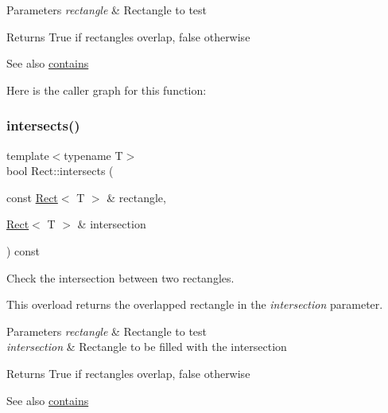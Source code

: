 \begin{DoxyParams}{Parameters}
{\em rectangle} & Rectangle to test\\
\hline
\end{DoxyParams}
\begin{DoxyReturn}{Returns}
True if rectangles overlap, false otherwise
\end{DoxyReturn}
\begin{DoxySeeAlso}{See also}
\hyperlink{classsf_1_1_rect_a1d8a4a3aecec18310f6e3e23db43dfb8}{contains} 
\end{DoxySeeAlso}
Here is the caller graph for this function\+:
\mbox{\label{classsf_1_1_rect_a555557c511ad6bfe0359a97c0ce1a003}} 
\subsubsection{\texorpdfstring{intersects()}{intersects()}\hspace{0.1cm}{\footnotesize\ttfamily [2/2]}}
{\footnotesize\ttfamily template$<$typename T$>$ \\
bool Rect\+::intersects (\begin{DoxyParamCaption}\item[{const \hyperlink{classsf_1_1_rect}{Rect}$<$ T $>$ \&}]{rectangle,  }\item[{\hyperlink{classsf_1_1_rect}{Rect}$<$ T $>$ \&}]{intersection }\end{DoxyParamCaption}) const}



Check the intersection between two rectangles. 

This overload returns the overlapped rectangle in the {\itshape intersection} parameter.


\begin{DoxyParams}{Parameters}
{\em rectangle} & Rectangle to test \\
\hline
{\em intersection} & Rectangle to be filled with the intersection\\
\hline
\end{DoxyParams}
\begin{DoxyReturn}{Returns}
True if rectangles overlap, false otherwise
\end{DoxyReturn}
\begin{DoxySeeAlso}{See also}
\hyperlink{classsf_1_1_rect_a1d8a4a3aecec18310f6e3e23db43dfb8}{contains} 
\end{DoxySeeAlso}


